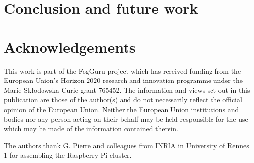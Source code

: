 \documentclass[10pt,conference]{IEEEtran}
\begin{document}
\section{Conclusion and future work}
\label{sec:conclusion}


\section*{Acknowledgements}

{\small This work is part of the FogGuru project which has received funding from the European Union’s Horizon 2020 research and innovation programme under the Marie Sk\l odowska-Curie grant 765452. The information and views set out
in this publication are those of the author(s) and do not necessarily reflect the official opinion of the European Union. Neither the European Union institutions and bodies nor any person acting on their behalf
may be held responsible for the use which may be made
of the information contained therein.}

{\small The authors thank G. Pierre and colleagues from INRIA in University of Rennes 1
  for assembling the Raspberry Pi cluster.}




\end{document}

